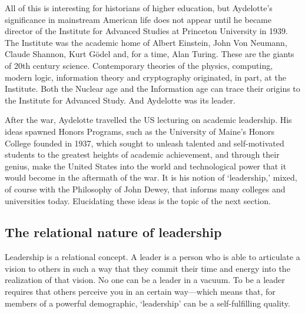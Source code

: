 All of this is interesting for historians of higher education, but Aydelotte's significance in mainstream American life does not appear until he became director of the Institute for Advanced Studies at Princeton University in 1939. The Institute was the academic home of Albert Einstein, John Von Neumann, Claude Shannon, Kurt Gödel and, for a time, Alan Turing. These are the giants of 20th century science. Contemporary theories of the physics, computing, modern logic, information theory and cryptography originated, in part, at the Institute. Both the Nuclear age and the Information age can trace their origins to the Institute for Advanced Study. And Aydelotte was its leader.

After the war, Aydelotte travelled the US lecturing on academic leadership. His ideas spawned Honors Programs, such as the University of Maine's Honors College founded in 1937, which sought to unleash talented and self-motivated students to the greatest heights of academic achievement, and through their genius, make the United States into the world and technological power that it would become in the aftermath of the war. It is his notion of `leadership,' mixed, of course with the Philosophy of John Dewey, that informs many colleges and universities today. Elucidating these ideas is the topic of the next section.

\subsection{The relational nature of leadership}
\label{therelationalnatureofleadership}

Leadership is a relational concept. A leader is a person who is able to articulate a vision to others in such a way that they commit their time and energy into the realization of that vision. No one can be a leader in a vacuum. To be a leader requires that others perceive you in an certain way---which means that, for members of a powerful demographic, `leadership' can be a self-fulfilling quality.


